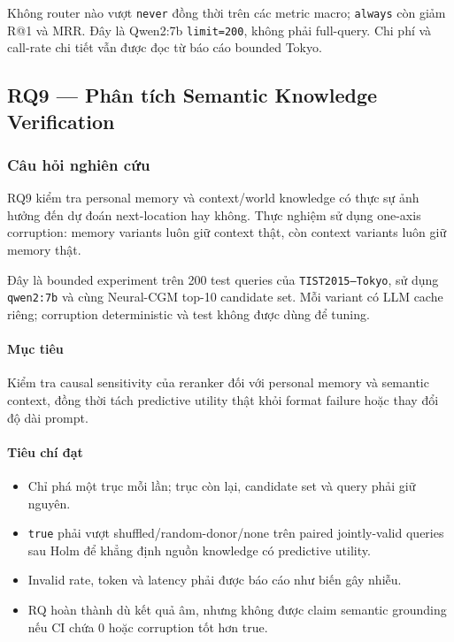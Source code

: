 Không router nào vượt \texttt{never} đồng thời trên các metric macro; \texttt{always} còn giảm R@1 và MRR. Đây là Qwen2:7b \texttt{limit=200}, không phải full-query. Chi phí và call-rate chi tiết vẫn được đọc từ báo cáo bounded Tokyo.


\subsection{RQ9 --- Phân tích Semantic Knowledge Verification}

\subsubsection*{Câu hỏi nghiên cứu}

RQ9 kiểm tra personal memory và context/world knowledge có thực sự ảnh hưởng đến dự đoán next-location hay không. Thực nghiệm sử dụng one-axis corruption: memory variants luôn giữ context thật, còn context variants luôn giữ memory thật.

Đây là bounded experiment trên 200 test queries của \texttt{TIST2015--Tokyo}, sử dụng \texttt{qwen2:7b} và cùng Neural-CGM top-10 candidate set. Mỗi variant có LLM cache riêng; corruption deterministic và test không được dùng để tuning.

\paragraph{Mục tiêu}

Kiểm tra causal sensitivity của reranker đối với personal memory và semantic context, đồng thời tách predictive utility thật khỏi format failure hoặc thay đổi độ dài prompt.

\paragraph{Tiêu chí đạt}

\begin{itemize}
\item Chỉ phá một trục mỗi lần; trục còn lại, candidate set và query phải giữ nguyên.
\item \texttt{true} phải vượt shuffled/random-donor/none trên paired jointly-valid queries
sau Holm để khẳng định nguồn knowledge có predictive utility.

\item Invalid rate, token và latency phải được báo cáo như biến gây nhiễu.
\item RQ hoàn thành dù kết quả âm, nhưng không được claim semantic grounding nếu CI
chứa 0 hoặc corruption tốt hơn true.

\end{itemize}

